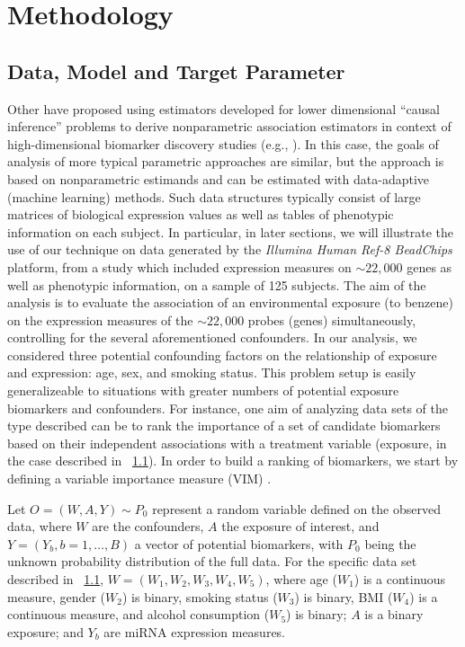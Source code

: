 \chapter{Methodology}

\section{Data, Model and Target Parameter}\label{data}

Other have proposed using estimators developed for lower dimensional ``causal
inference'' problems to derive nonparametric association estimators in context
of high-dimensional biomarker discovery studies (e.g.,
\cite{tuglus2011targeted}). In this case, the goals of analysis of more typical
parametric approaches are similar, but the approach is based on nonparametric
estimands and can be estimated with data-adaptive (machine learning) methods.
Such data structures typically consist of large matrices of biological
expression values as well as tables of phenotypic information on each subject.
In particular, in later sections, we will illustrate the use of our technique on
data generated by the \textit{Illumina Human Ref-8 BeadChips} platform, from a
study which included expression measures on $\sim 22,000$ genes as well as
phenotypic information, on a sample of 125 subjects. The aim of the analysis is
to evaluate the association of an environmental exposure (to benzene) on the
expression measures of the $\sim 22,000$ probes (genes) simultaneously,
controlling for the several aforementioned confounders. In our analysis, we
considered three potential confounding factors on the relationship of exposure
and expression: age, sex, and smoking status. This problem setup is easily
generalizeable to situations with greater numbers of potential exposure
biomarkers and confounders. For instance, one  aim of analyzing data sets of
the type described can be to rank the importance of a set of candidate
biomarkers based on their independent associations with a treatment variable
(exposure, in the case described in ~\ref{data}). In order to build a ranking of
biomarkers, we start by defining a variable importance measure (VIM)
\cite{van2011targeted}.

Let $O = (W, A, Y) \sim P_{0}$ represent a random variable defined on the
observed data, where $W$ are the confounders, $A$ the exposure of interest,
and $Y=(Y_b, b = 1, \dots, B)$ a vector of potential biomarkers, with $P_{0}$
being the unknown probability distribution of the full data. For the specific
data set described in ~\ref{data}, $W = (W_{1}, W_{2}, W_{3}, W_{4}, W_{5})$,
where age ($W_{1}$) is a continuous measure, gender ($W_{2}$) is binary,
smoking status ($W_{3}$) is binary, BMI ($W_{4}$) is a continuous measure, and
alcohol consumption ($W_{5}$) is binary; $A$ is a binary exposure; and $Y_{b}$
are miRNA expression measures.

